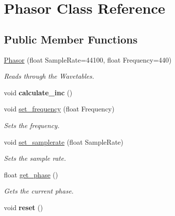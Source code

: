 \hypertarget{class_phasor}{}\section{Phasor Class Reference}
\label{class_phasor}
\subsection*{Public Member Functions}
\begin{DoxyCompactItemize}
\item 
\hyperlink{class_phasor_a6a990a7bc7059ffbfdf33b370962c998}{Phasor} (float Sample\+Rate=44100, float Frequency=440)
\begin{DoxyCompactList}\small\item\em Reads through the Wavetables. \end{DoxyCompactList}\item 
void {\bfseries calculate\+\_\+inc} ()\hypertarget{class_phasor_a3b58dc7b5391d649eedbc10d33e61f7c}{}\label{class_phasor_a3b58dc7b5391d649eedbc10d33e61f7c}

\item 
void \hyperlink{class_phasor_a8b10e31b20a64badc13d7b51462fe716}{set\+\_\+frequency} (float Frequency)\hypertarget{class_phasor_a8b10e31b20a64badc13d7b51462fe716}{}\label{class_phasor_a8b10e31b20a64badc13d7b51462fe716}

\begin{DoxyCompactList}\small\item\em Sets the frequency. \end{DoxyCompactList}\item 
void \hyperlink{class_phasor_ab89687b37a5e5d9949fe3a318d0debaa}{set\+\_\+samplerate} (float Sample\+Rate)\hypertarget{class_phasor_ab89687b37a5e5d9949fe3a318d0debaa}{}\label{class_phasor_ab89687b37a5e5d9949fe3a318d0debaa}

\begin{DoxyCompactList}\small\item\em Sets the sample rate. \end{DoxyCompactList}\item 
float \hyperlink{class_phasor_a03981c64d306bc81bfdfa754664f0a70}{get\+\_\+phase} ()\hypertarget{class_phasor_a03981c64d306bc81bfdfa754664f0a70}{}\label{class_phasor_a03981c64d306bc81bfdfa754664f0a70}

\begin{DoxyCompactList}\small\item\em Gets the current phase. \end{DoxyCompactList}\item 
void {\bfseries reset} ()\hypertarget{class_phasor_ac83105214a81a0bb911aeb23b13f841b}{}\label{class_phasor_ac83105214a81a0bb911aeb23b13f841b}


\end{DoxyCompactItemize}
